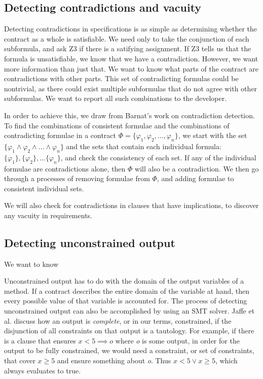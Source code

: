 \documentclass{article}
\newif\ifcomments
\newcommand{\egm}[1]{\ifcomments\textcolor{orange}{egm: #1}\fi}
\begin{document}
\subsection{Detecting contradictions and vacuity}

Detecting contradictions in specifications is as simple as determining whether the contract as a whole is satisfiable.
We need only to take the conjunction of each subformula, and ask Z3 if there is a satifying assignment. If Z3 tells us that the
formula is unsatisfiable, we know that we have a contradiction. However, we want more information than just that. We
want to know what parts of the contract are contradictions with other parts. This set of contradicting formulas could be
nontrivial, as there could exist multiple subformulas that do not agree with other subformulas. We want to report all
such combinations to the developer.

In order to achieve this, we draw from Barnat's \cite{barnat2016analysing} work on contradiction detection.
To find the combinations of consistent formulae and the combinations of contradicting formulae in a contract
\(\Phi = \{\varphi_{1}, \varphi_{2}, ..., \varphi_{n}\}\), we start with the set \(\{\varphi_{1} \land \varphi_{2} \land ... \land \varphi_{n}\} \)
and the sets that contain each individual formula: \(\{\varphi_{1}\}, \{\varphi_{2}\}, ... \{\varphi_{n}\} \), and check
the consistency of each set. If any of the individual formulae are contradictions alone, then \(\Phi\) will also be a contradiction.
We then go through a processes of removing formulae from \(\Phi\), and adding formulae to consistent individual sets.

We will also check for contradictions in clauses that have implications, to discover any vacuity in requirements.

\subsection{Detecting unconstrained output}

We want to know 

Unconstrained output has to do with the domain of the output variables of a method. If a contract describes the entire
domain of the variable at hand, then every possible value of that variable is accounted for. The process of detecting
unconstrained output can also be accomplished by using an SMT solver. Jaffe et al. \cite{jaffe1989completeness} discuss how
an output is \emph{complete}, or in our terms, constrained, if the disjunction of all constraints on that output is a
tautology. For example, if there is a clause that ensures \(x < 5 \implies o\) where {\it o} is some  output, in order
for the output to be fully constrained, we would need a constraint, or set of constraints, that cover \(x \geq 5\) and ensure 
something about {\it o}. Thus \(x < 5 \lor x \geq 5\), which always evaluates to true. \egm{This statement is not correct. Try it in dafny. What happens is that dafny can prove something about the output when $x < 5$ but it can say nothing about the output when $x \ge 5$ so any assertion that you write will fail in that case.}
\end{document}
